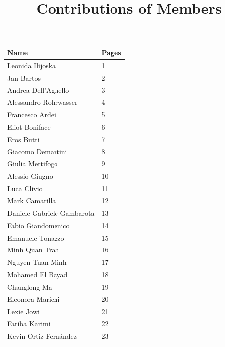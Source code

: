 \documentclass[11pt]{article}
\title{Contributions of Members}
\author{}
\date{}
\begin{document}
\maketitle

\begin{center}
\begin{tabular}{|l|p{11cm}|}
\hline
\textbf{Name} & \textbf{Pages} \\ \hline
Leonida Ilijoska & 1 \\ \hline
Jan Bartos & 2 \\ \hline
Andrea Dell'Agnello & 3 \\ \hline
Alessandro Rohrwasser & 4 \\ \hline
Francesco Ardei & 5 \\ \hline
Eliot Boniface & 6 \\ \hline
Eros Butti & 7 \\ \hline
Giacomo Demartini & 8 \\ \hline
Giulia Mettifogo & 9 \\ \hline
Alessio Giugno & 10 \\ \hline
Luca Clivio & 11 \\ \hline
Mark Camarilla & 12 \\ \hline
Daniele Gabriele Gambarota & 13 \\ \hline
Fabio Giandomenico & 14 \\ \hline
Emanuele Tonazzo & 15 \\ \hline
Minh Quan Tran & 16 \\ \hline
Nguyen Tuan Minh & 17 \\ \hline
Mohamed El Bayad & 18 \\ \hline
Changlong Ma & 19 \\ \hline
Eleonora Marichi & 20 \\ \hline
Lexie Jowi & 21 \\ \hline
Fariba Karimi & 22 \\ \hline
Kevin Ortiz Fernández & 23 \\ \hline
\end{tabular}
\end{center}
\end{document}
